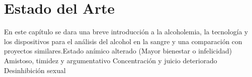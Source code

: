 \chapter{Estado del Arte}
En este capítulo se dara una breve introducción a la alcoholemia, la tecnología y los dispositivos para el análisis del alcohol en la sangre y una comparación con proyectos similares.Estado anímico alterado (Mayor bienestar o infelicidad)
Amistoso, timidez y argumentativo
Concentración y juicio deteriorado
Desinhibición sexual
